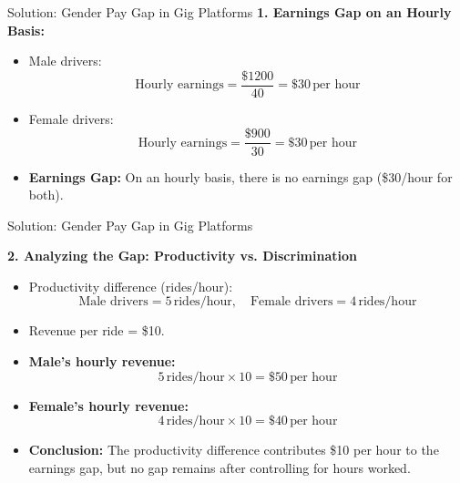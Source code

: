 \documentclass{beamer}
\begin{document}
\begin{frame}{Solution: Gender Pay Gap in Gig Platforms}
    \textbf{1. Earnings Gap on an Hourly Basis:}
    \begin{itemize}
        \item Male drivers: 
        \[
        \text{Hourly earnings} = \frac{\$1200}{40} = \$30 \, \text{per hour}
        \]
        \item Female drivers: 
        \[
        \text{Hourly earnings} = \frac{\$900}{30} = \$30 \, \text{per hour}
        \]
        \item \textbf{Earnings Gap:} On an hourly basis, there is no earnings gap (\$30/hour for both).
    \end{itemize}
    

\end{frame}



\begin{frame}{Solution: Gender Pay Gap in Gig Platforms}

    
    \textbf{2. Analyzing the Gap: Productivity vs. Discrimination}
    \begin{itemize}
        \item Productivity difference (rides/hour):
        \[
        \text{Male drivers} = 5 \, \text{rides/hour}, \quad \text{Female drivers} = 4 \, \text{rides/hour}
        \]
        \item Revenue per ride = \$10.
        \item \textbf{Male's hourly revenue:} 
        \[
        5 \, \text{rides/hour} \times 10 = \$50 \, \text{per hour}
        \]
        \item \textbf{Female's hourly revenue:}
        \[
        4 \, \text{rides/hour} \times 10 = \$40 \, \text{per hour}
        \]
        \item \textbf{Conclusion:} The productivity difference contributes \$10 per hour to the earnings gap, but no gap remains after controlling for hours worked.
    \end{itemize}
\end{frame}
\end{document}
